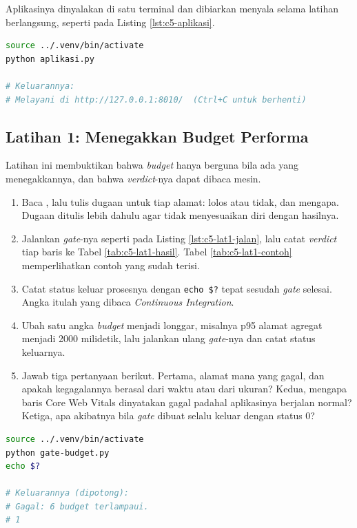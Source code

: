 Aplikasinya dinyalakan di satu terminal dan dibiarkan menyala selama latihan
berlangsung, seperti pada Listing \ref{lst:c5-aplikasi}.

\begin{lstlisting}[language=bash, caption={Menyalakan aplikasi yang diukur, tersedia di \berkas{sources/chapter05/aplikasi.py}}, label={lst:c5-aplikasi}]
source ../.venv/bin/activate
python aplikasi.py

# Keluarannya:
# Melayani di http://127.0.0.1:8010/  (Ctrl+C untuk berhenti)
\end{lstlisting}

\subsection*{Latihan 1: Menegakkan Budget Performa}

Latihan ini membuktikan bahwa \textit{budget} hanya berguna bila ada yang
menegakkannya, dan bahwa \textit{verdict}-nya dapat dibaca mesin.

\begin{enumerate}
  \item Baca , lalu tulis dugaan
        untuk tiap alamat: lolos atau tidak, dan mengapa. Dugaan ditulis
        lebih dahulu agar tidak menyesuaikan diri dengan hasilnya.
  \item Jalankan \textit{gate}-nya seperti pada Listing \ref{lst:c5-lat1-jalan},
        lalu catat \textit{verdict} tiap baris ke Tabel \ref{tab:c5-lat1-hasil}. Tabel
        \ref{tab:c5-lat1-contoh} memperlihatkan contoh yang sudah terisi.
  \item Catat status keluar prosesnya dengan \texttt{echo \$?} tepat sesudah
        \textit{gate} selesai. Angka itulah yang dibaca \textit{Continuous
        Integration}.
  \item Ubah satu angka \textit{budget} menjadi longgar, misalnya p95 alamat agregat
        menjadi 2000 milidetik, lalu jalankan ulang \textit{gate}-nya dan catat
        status keluarnya.
  \item Jawab tiga pertanyaan berikut. Pertama, alamat mana yang gagal, dan
        apakah kegagalannya berasal dari waktu atau dari ukuran? Kedua,
        mengapa baris Core Web Vitals dinyatakan gagal padahal aplikasinya
        berjalan normal? Ketiga, apa akibatnya bila \textit{gate} dibuat selalu
        keluar dengan status 0?
\end{enumerate}

\begin{lstlisting}[language=bash, caption={Menjalankan \textit{gate} budget dan membaca status keluarnya, tersedia di \berkas{sources/chapter05/gate-budget.py}}, label={lst:c5-lat1-jalan}]
source ../.venv/bin/activate
python gate-budget.py
echo $?

# Keluarannya (dipotong):
# Gagal: 6 budget terlampaui.
# 1
\end{lstlisting}

